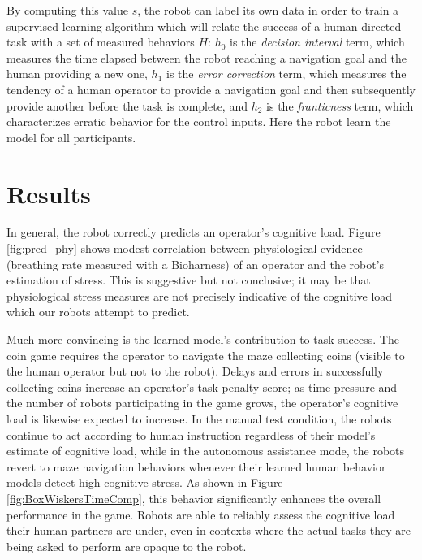 \documentclass{sig-alternate}
\begin{document}
By computing this value $s$, the robot can label its own data in order to train a supervised learning algorithm which
will relate the success of a human-directed task with a set of measured behaviors $H$: $h_0$ is the \emph{decision
interval} term, which measures the time elapsed between the robot reaching a navigation goal and the human providing a
new one, $h_1$ is the \emph{error correction} term, which measures the tendency of a human operator to provide a
navigation goal and then subsequently provide another before the task is complete, and $h_2$ is the \emph{franticness}
term, which characterizes erratic behavior for the control inputs. Here the robot learn the model for all participants.

\section{Results}

In general, the robot correctly predicts an operator's cognitive load. Figure \ref{fig:pred_phy} shows modest
correlation between physiological evidence (breathing rate measured with a Bioharness) of an operator and the robot's
estimation of stress. This is suggestive but not conclusive; it may be that physiological stress measures are not
precisely indicative of the cognitive load which our robots attempt to predict.

Much more convincing is the learned model's contribution to task success. The coin game requires the operator to
navigate the maze collecting coins (visible to the human operator but not to the robot). Delays and errors in
successfully collecting coins increase an operator's task penalty score; as time pressure and the number of robots
participating in the game grows, the operator's cognitive load is likewise expected to increase. In the manual test
condition, the robots continue to act according to human instruction regardless of their model's estimate of cognitive
load, while in the autonomous assistance mode, the robots revert to maze navigation behaviors whenever their learned
human behavior models detect high cognitive stress. As shown in Figure \ref{fig:BoxWiskersTimeComp}, this behavior
significantly enhances the overall performance in the game. Robots are able to reliably assess the cognitive load
their human partners are under, even in contexts where the actual tasks they are being asked to perform are opaque to
the robot.
\end{document}
